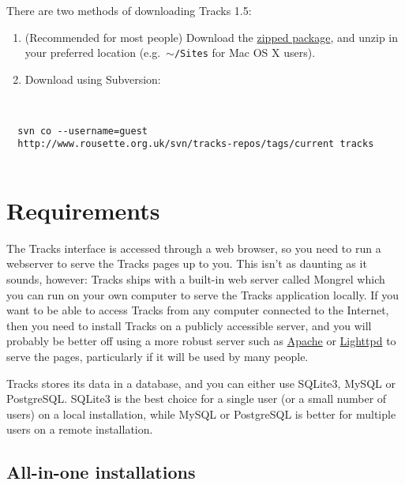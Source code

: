 \documentclass[10pt,twoside]{memoir}
\begin{document}
There are two methods of downloading Tracks 1.5:


\begin{enumerate}


\item (Recommended for most people) Download the \href{http://www.rousette.org.uk/projects/files/tracks-current.zip}{zipped package}, and unzip in your preferred location (e.g.\ \texttt{\ensuremath{\sim}/Sites} for Mac OS X users).

\item Download using Subversion:
\end{enumerate}

\begin{adjustwidth}{2.5em}{2.5em}
\begin{verbatim}


  svn co --username=guest
  http://www.rousette.org.uk/svn/tracks-repos/tags/current tracks


\end{verbatim}
\end{adjustwidth}

\section{Requirements}
\label{requirements}

The Tracks interface is accessed through a web browser, so you need to run a webserver to serve the Tracks pages up to you. This isn't as daunting as it sounds, however: Tracks ships with a built-in web server called Mongrel which you can run on your own computer to serve the Tracks application locally. If you want to be able to access Tracks from any computer connected to the Internet, then you need to install Tracks on a publicly accessible server, and you will probably be better off using a more robust server such as \href{http://www.apache.org/}{Apache} or \href{http://www.lighttpd.net/}{Lighttpd} to serve the pages, particularly if it will be used by many people.


Tracks stores its data in a database, and you can either use SQLite3, MySQL or PostgreSQL. SQLite3 is the best choice for a single user (or a small number of users) on a local installation, while MySQL or PostgreSQL is better for multiple users on a remote installation.


\subsection{All-in-one installations}
\label{all-in-oneinstallations}
\end{document}
